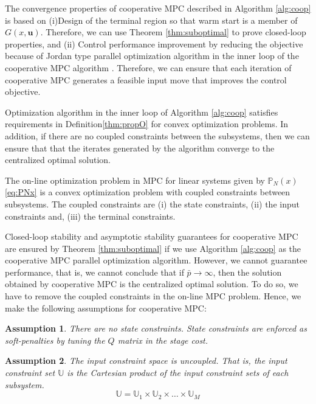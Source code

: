 \documentclass[10pt]{article}
\newcommand{\bu}{\mathbf{u}}
\newtheorem{assumption}{Assumption}
\theoremstyle{definition}
\begin{document}
The convergence properties of cooperative MPC described in Algorithm
\ref{alg:coop} is based on (i)Design of the terminal region so that warm start is a member of
  $G(x,\bu)$. Therefore, we can use Theorem \ref{thm:suboptimal} to
  prove closed-loop properties, and (ii) Control performance improvement by reducing the objective
 because of Jordan type parallel optimization algorithm in the inner
 loop of the cooperative MPC algorithm \citep[Section
3.3.5]{bertsekas:tsitsiklis:1989}. Therefore, we can ensure that each
iteration of cooperative MPC generates a feasible input move that
improves the control objective.  

Optimization algorithm in the inner loop of Algorithm \ref{alg:coop} satisfies requirements in Definition\ref{thm:propO}
for convex optimization problems. In addition, if there are no coupled
constraints between the subsystems, then we can ensure that that the
iterates generated by the algorithm converge to the centralized
optimal solution. 

The on-line optimization problem in MPC for linear systems given by
$\mathbb{P}_N(x)$ \eqref{eq:PNx} is a convex optimization problem with
coupled constraints between subsystems. The coupled constraints are
(i) the state constraints, (ii) the input constraints and, (iii) the
terminal constraints.

Closed-loop stability and asymptotic stability  guarantees for
cooperative MPC are ensured by Theorem \ref{thm:suboptimal} if we use
Algorithm \ref{alg:coop} as the cooperative MPC parallel
optimization algorithm. However,
we cannot guarantee performance, that is, we cannot conclude that if
$\bar{p} \rightarrow \infty$, then the solution obtained by
cooperative MPC is the centralized optimal solution. To do so, we have
to remove the coupled constraints in the on-line MPC problem. Hence,
we make the following assumptions for cooperative MPC:

\begin{assumption}
\label{ass:noX}
There are no state constraints. State constraints are enforced as
soft-penalties by tuning the $Q$ matrix in the stage cost.
\end{assumption}

\begin{assumption}
\label{ass:uncoupledU}
The input constraint space is uncoupled. That is, the input constraint
set $\mathbb{U}$ is the Cartesian product of the input constraint sets
of each subsystem. 
\[ \mathbb{U} = \mathbb{U}_1 \times \mathbb{U}_2 \times \ldots \times
\mathbb{U}_M
\]
\end{assumption}
\end{document}
